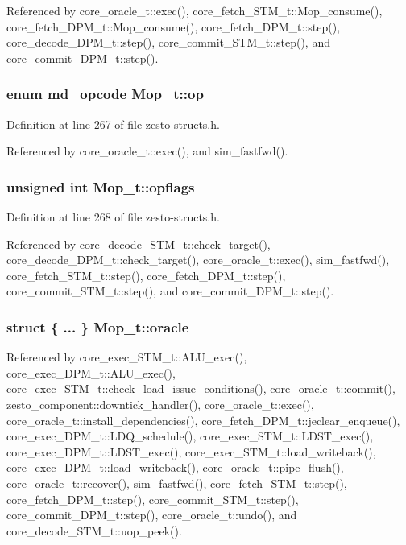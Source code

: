Referenced by core\_\-oracle\_\-t::exec(), core\_\-fetch\_\-STM\_\-t::Mop\_\-consume(), core\_\-fetch\_\-DPM\_\-t::Mop\_\-consume(), core\_\-fetch\_\-DPM\_\-t::step(), core\_\-decode\_\-DPM\_\-t::step(), core\_\-commit\_\-STM\_\-t::step(), and core\_\-commit\_\-DPM\_\-t::step().
\subsubsection[{op}]{\setlength{\rightskip}{0pt plus 5cm}enum {\bf md\_\-opcode} {\bf Mop\_\-t::op}}\label{structMop__t_59504c7680bff25f84fca7951439626a}




Definition at line 267 of file zesto-structs.h.

Referenced by core\_\-oracle\_\-t::exec(), and sim\_\-fastfwd().
\subsubsection[{opflags}]{\setlength{\rightskip}{0pt plus 5cm}unsigned int {\bf Mop\_\-t::opflags}}\label{structMop__t_7301ad4e0c0f5ece738ba62448f7c655}




Definition at line 268 of file zesto-structs.h.

Referenced by core\_\-decode\_\-STM\_\-t::check\_\-target(), core\_\-decode\_\-DPM\_\-t::check\_\-target(), core\_\-oracle\_\-t::exec(), sim\_\-fastfwd(), core\_\-fetch\_\-STM\_\-t::step(), core\_\-fetch\_\-DPM\_\-t::step(), core\_\-commit\_\-STM\_\-t::step(), and core\_\-commit\_\-DPM\_\-t::step().
\subsubsection[{oracle}]{\setlength{\rightskip}{0pt plus 5cm}struct \{ ... \}   {\bf Mop\_\-t::oracle}}\label{structMop__t_f445a1796fbcfb01bb7094b956b4361a}




Referenced by core\_\-exec\_\-STM\_\-t::ALU\_\-exec(), core\_\-exec\_\-DPM\_\-t::ALU\_\-exec(), core\_\-exec\_\-STM\_\-t::check\_\-load\_\-issue\_\-conditions(), core\_\-oracle\_\-t::commit(), zesto\_\-component::downtick\_\-handler(), core\_\-oracle\_\-t::exec(), core\_\-oracle\_\-t::install\_\-dependencies(), core\_\-fetch\_\-DPM\_\-t::jeclear\_\-enqueue(), core\_\-exec\_\-DPM\_\-t::LDQ\_\-schedule(), core\_\-exec\_\-STM\_\-t::LDST\_\-exec(), core\_\-exec\_\-DPM\_\-t::LDST\_\-exec(), core\_\-exec\_\-STM\_\-t::load\_\-writeback(), core\_\-exec\_\-DPM\_\-t::load\_\-writeback(), core\_\-oracle\_\-t::pipe\_\-flush(), core\_\-oracle\_\-t::recover(), sim\_\-fastfwd(), core\_\-fetch\_\-STM\_\-t::step(), core\_\-fetch\_\-DPM\_\-t::step(), core\_\-commit\_\-STM\_\-t::step(), core\_\-commit\_\-DPM\_\-t::step(), core\_\-oracle\_\-t::undo(), and core\_\-decode\_\-STM\_\-t::uop\_\-peek().

